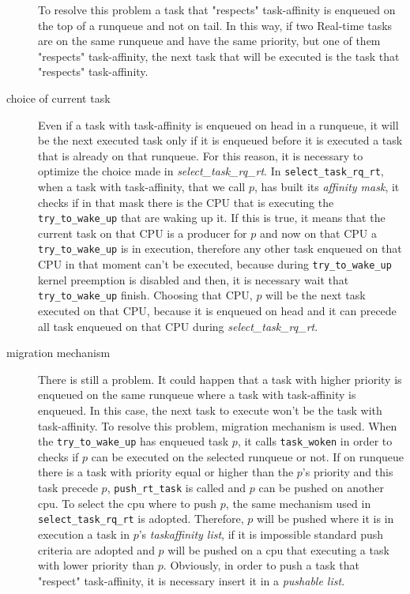 \begin{description}
To resolve this problem a task that "respects" task-affinity is enqueued on the top of a runqueue and not on tail. In this way, if two Real-time tasks are 
on the same runqueue and have the same priority, but one of them "respects" task-affinity, the next task that will be executed is the task that "respects" 
task-affinity. 

\item[choice of current task] Even if a task with task-affinity is enqueued on head in a runqueue, it will be the next executed task only if it is enqueued 
before it is executed a task that is already on that runqueue. For this reason, it is necessary to optimize the choice made in \textit{select\_task\_rq\_rt}.
In \texttt{select\_task\_rq\_rt}, when a task with task-affinity, that we call $p$, has built its \textit{affinity mask}, it checks if in that mask there 
is the CPU that is executing the \texttt{try\_to\_wake\_up} that are waking up it. If this is true, it means that the current task on that CPU is a 
producer for $p$ and now on that CPU a \texttt{try\_to\_wake\_up} is in execution, therefore any other task enqueued on that CPU in that moment can't be 
executed, because during \texttt{try\_to\_wake\_up} kernel preemption is disabled and then, it is necessary wait that \texttt{try\_to\_wake\_up} finish.
Choosing that CPU, $p$ will be the next task executed on that CPU, because it is enqueued on head and it can precede all task enqueued on that CPU during
\textit{select\_task\_rq\_rt}.

\item[migration mechanism] There is still a problem. It could happen that a task with higher priority is enqueued on the same runqueue where a task with 
task-affinity is enqueued. In this case, the next task to execute won't be the task with task-affinity.
To resolve this problem, migration mechanism is used. When the \texttt{try\_to\_wake\_up} has enqueued task $p$, it calls \texttt{task\_woken} in order to
checks if $p$ can be executed on the selected runqueue or not. If on runqueue there is a task with priority equal or higher than the $p$'s priority and 
this task precede $p$, \texttt{push\_rt\_task} is called and $p$ can be pushed on another cpu. To select the cpu where to push $p$, the same mechanism used 
in \texttt{select\_task\_rq\_rt} is adopted. Therefore, $p$ will be pushed where it is in execution a task in $p$'s \textit{taskaffinity list}, if it is 
impossible standard push criteria are adopted and $p$ will be pushed on a cpu that executing a task with lower priority than $p$. Obviously, in order to 
push a task that "respect" task-affinity, it is necessary insert it in a \textit{pushable list}. 

\end{description}
